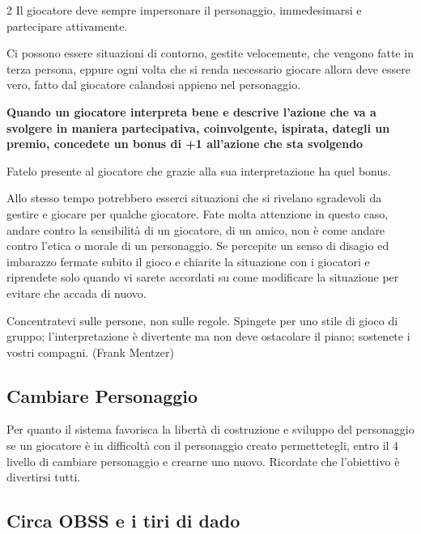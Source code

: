 \begin{multicols}{2}
Il giocatore deve sempre impersonare il personaggio, immedesimarsi e partecipare attivamente.

Ci possono essere situazioni di contorno, gestite velocemente, che vengono fatte in terza persona, eppure ogni volta che si renda necessario giocare allora deve essere vero, fatto dal giocatore calandosi appieno nel personaggio.

\medskip

\textbf{Quando un giocatore interpreta bene e descrive l'azione che va a svolgere in maniera \textbf{partecipativa}, \textbf{coinvolgente}, \textbf{ispirata}, dategli un premio, concedete un bonus di +1 all'azione che sta svolgendo}

\medskip

Fatelo presente al giocatore che grazie alla sua interpretazione ha quel bonus.

Allo stesso tempo potrebbero esserci situazioni che si rivelano sgradevoli da gestire e giocare per qualche giocatore. Fate molta attenzione in questo caso, andare contro la sensibilità di un giocatore, di un amico, non è come andare contro l'etica o morale di un personaggio. Se percepite un senso di disagio ed imbarazzo fermate subito il gioco e chiarite la situazione con i giocatori e riprendete solo quando vi sarete accordati su come modificare la situazione per evitare che accada di nuovo.

\begin{enfasi}
{Concentratevi sulle persone, non sulle regole. Spingete per uno stile di gioco di gruppo; l'interpretazione è divertente ma non deve ostacolare il piano; sostenete i vostri compagni. (Frank Mentzer)}\end{enfasi}

\subsection{Cambiare Personaggio}

Per quanto il sistema favorisca la libertà di costruzione e sviluppo del personaggio se un giocatore è in difficoltà con il personaggio creato permettetegli, entro il 4 livello di cambiare personaggio e crearne uno nuovo. Ricordate che l'obiettivo è divertirsi tutti.

\subsection{Circa OBSS e i tiri di dado}\label{obssedadi}


\end{multicols}
